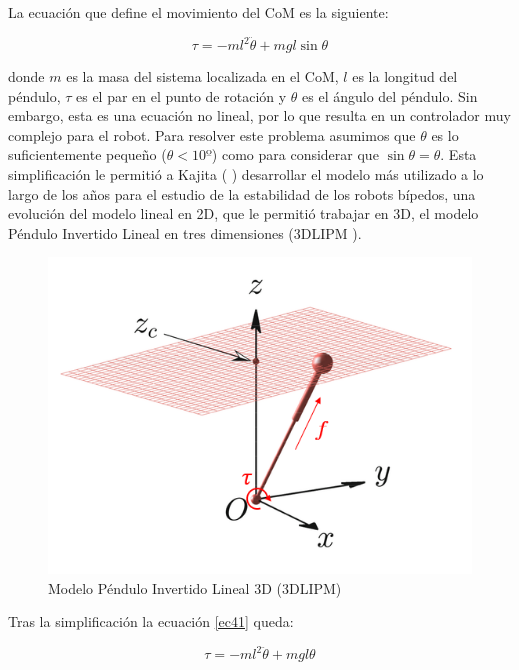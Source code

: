 La ecuación que define el movimiento del CoM es la siguiente:

\begin{equation}
\tau = - ml^2\ddot{\theta}+mgl\sin\theta
\label{ec41}
\end{equation}

donde $m$ es la masa del sistema localizada en el CoM, $l$ es la longitud del péndulo, $\tau$ es el par en el punto de rotación y $\theta$ es el ángulo del péndulo. Sin embargo, esta es una ecuación no lineal, por lo que resulta en un controlador muy complejo para el robot. Para resolver este problema asumimos que $\theta$ es lo suficientemente pequeño ($\theta<10º$) como para considerar que $\sin\theta=\theta$. Esta simplificación le permitió a Kajita (%
) desarrollar el modelo más utilizado a lo largo de los años para el estudio de la estabilidad de los robots bípedos, una evolución del modelo lineal en 2D, que le permitió trabajar en 3D, el modelo Péndulo Invertido Lineal en tres dimensiones (3DLIPM%
)\cite{ref15}.

\begin{figure}[H]
\centering
\includegraphics[scale=0.5]{imagenes/apartado_4/43_3D_linear_inverted_pendulum_model}
\caption{Modelo Péndulo Invertido Lineal 3D (3DLIPM)}
\label{figura43}
\end{figure}

Tras la simplificación la ecuación \ref{ec41} queda:

\begin{equation}
\tau = - ml^2\ddot{\theta}+mgl\theta
\label{ec42}
\end{equation}

